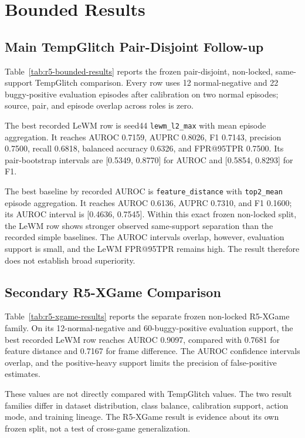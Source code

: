\section{Bounded Results}
\label{sec:results}

\subsection{Main TempGlitch Pair-Disjoint Follow-up}

Table~\ref{tab:r5-bounded-results} reports the frozen pair-disjoint, non-locked, same-support
TempGlitch comparison. Every row uses 12 normal-negative and 22 buggy-positive evaluation
episodes after calibration on two normal episodes; source, pair, and episode overlap across roles
is zero.



The best recorded LeWM row is seed44 \texttt{lewm\_l2\_max} with mean episode aggregation. It
reaches AUROC 0.7159, AUPRC 0.8026, F1 0.7143, precision 0.7500, recall 0.6818, balanced accuracy
0.6326, and FPR@95TPR 0.7500. Its pair-bootstrap intervals are [0.5349, 0.8770] for AUROC and
[0.5854, 0.8293] for F1.

The best baseline by recorded AUROC is \texttt{feature\_distance} with
\texttt{top2\_mean} episode aggregation. It reaches AUROC 0.6136, AUPRC 0.7310, and F1 0.1600;
its AUROC interval is [0.4636, 0.7545]. Within this exact frozen non-locked split, the LeWM row
shows stronger observed same-support separation than the recorded simple baselines. The AUROC
intervals overlap, however, evaluation support is small, and the LeWM FPR@95TPR remains high.
The result therefore does not establish broad superiority.

\subsection{Secondary R5-XGame Comparison}

Table~\ref{tab:r5-xgame-results} reports the separate frozen non-locked R5-XGame family. On its
12-normal-negative and 60-buggy-positive evaluation support, the best recorded LeWM row reaches
AUROC 0.9097, compared with 0.7681 for feature distance and 0.7167 for frame difference. The
AUROC confidence intervals overlap, and the positive-heavy support limits the precision of
false-positive estimates.



These values are not directly compared with TempGlitch values. The two result families differ in
dataset distribution, class balance, calibration support, action mode, and training lineage. The
R5-XGame result is evidence about its own frozen split, not a test of cross-game generalization.

